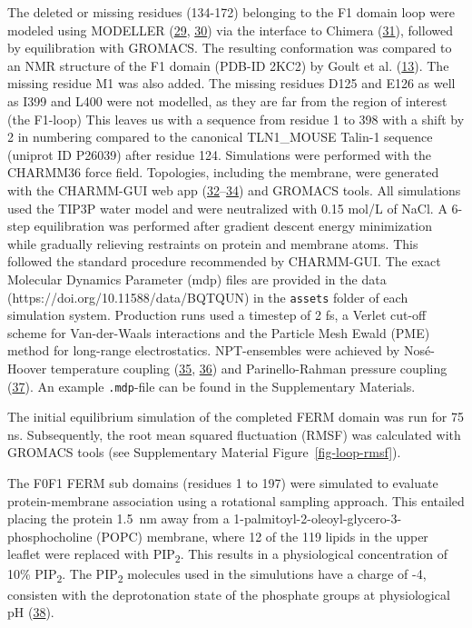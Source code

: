 \documentclass[
  twocolumn]{biophys-new-mod}
\begin{document}
The deleted or missing residues (134-172) belonging to the F1 domain
loop were modeled using MODELLER
(\protect\hyperlink{ref-marti-renomComparativeProteinStructure2000}{29},
\protect\hyperlink{ref-webbComparativeProteinStructure2016}{30}) via the
interface to Chimera
(\protect\hyperlink{ref-pettersenUCSFChimeraVisualization2004}{31}),
followed by equilibration with GROMACS. The resulting conformation was
compared to an NMR structure of the F1 domain (PDB-ID 2KC2) by Goult et
al. (\protect\hyperlink{ref-goultStructureDoubleUbiquitinlike2010}{13}).
The missing residue M1 was also added. The missing residues D125 and
E126 as well as I399 and L400 were not modelled, as they are far from
the region of interest (the F1-loop) This leaves us with a sequence from
residue 1 to 398 with a shift by 2 in numbering compared to the
canonical TLN1\_MOUSE Talin-1 sequence (uniprot ID P26039) after residue
124. Simulations were performed with the CHARMM36 force field.
Topologies, including the membrane, were generated with the CHARMM-GUI
web app
(\protect\hyperlink{ref-brooksCHARMMBiomolecularSimulation2009}{32}--\protect\hyperlink{ref-leeCHARMMGUIInputGenerator2016}{34})
and GROMACS tools. All simulations used the TIP3P water model and were
neutralized with 0.15 mol/L of NaCl. A 6-step equilibration was
performed after gradient descent energy minimization while gradually
relieving restraints on protein and membrane atoms. This followed the
standard procedure recommended by CHARMM-GUI. The exact Molecular
Dynamics Parameter (mdp) files are provided in the data
(https://doi.org/10.11588/data/BQTQUN) in the \texttt{assets} folder of
each simulation system. Production runs used a timestep of 2 fs, a
Verlet cut-off scheme for Van-der-Waals interactions and the Particle
Mesh Ewald (PME) method for long-range electrostatics. NPT-ensembles
were achieved by Nosé-Hoover temperature coupling
(\protect\hyperlink{ref-hooverCanonicalDynamicsEquilibrium1985}{35},
\protect\hyperlink{ref-noseUnifiedFormulationConstant1984}{36}) and
Parinello-Rahman pressure coupling
(\protect\hyperlink{ref-parrinelloPolymorphicTransitionsSingle1981}{37}).
An example \texttt{.mdp}-file can be found in the Supplementary
Materials.

The initial equilibrium simulation of the completed FERM domain was run
for 75 ns. Subsequently, the root mean squared fluctuation (RMSF) was
calculated with GROMACS tools (see Supplementary Material
Figure~\ref{fig-loop-rmsf}).

The F0F1 FERM sub domains (residues 1 to 197) were simulated to evaluate
protein-membrane association using a rotational sampling approach. This
entailed placing the protein 1.5~nm away from a
1-palmitoyl-2-oleoyl-glycero-3-phosphocholine (POPC) membrane, where 12
of the 119 lipids in the upper leaflet were replaced with
PIP\textsubscript{2}. This results in a physiological concentration of
10\% PIP\textsubscript{2}. The PIP\textsubscript{2} molecules used in
the simulutions have a charge of -4, consisten with the deprotonation
state of the phosphate groups at physiological pH
(\protect\hyperlink{ref-mclaughlinPIP2ProteinsInteractions2002}{38}).
\end{document}
